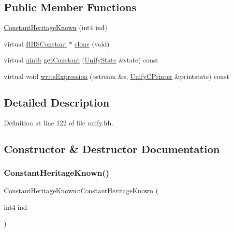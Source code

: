 \subsection*{Public Member Functions}
\begin{DoxyCompactItemize}
\item 
\mbox{\hyperlink{class_constant_heritage_known_aa29b63bf5dba8c4b2e4a177aefebe536}{Constant\+Heritage\+Known}} (int4 ind)
\item 
virtual \mbox{\hyperlink{class_r_h_s_constant}{R\+H\+S\+Constant}} $\ast$ \mbox{\hyperlink{class_constant_heritage_known_a07568a5e04c406e0a08fe2f07f15ccc1}{clone}} (void)
\item 
virtual \mbox{\hyperlink{types_8h_a2db313c5d32a12b01d26ac9b3bca178f}{uintb}} \mbox{\hyperlink{class_constant_heritage_known_a700e11fdfe28144dff4f55f05620f7b4}{get\+Constant}} (\mbox{\hyperlink{class_unify_state}{Unify\+State}} \&state) const
\item 
virtual void \mbox{\hyperlink{class_constant_heritage_known_a52ea0bf86bff79609c576a29a523660a}{write\+Expression}} (ostream \&s, \mbox{\hyperlink{class_unify_c_printer}{Unify\+C\+Printer}} \&printstate) const
\end{DoxyCompactItemize}


\subsection{Detailed Description}


Definition at line 122 of file unify.\+hh.



\subsection{Constructor \& Destructor Documentation}
\mbox{\label{class_constant_heritage_known_aa29b63bf5dba8c4b2e4a177aefebe536}} 
\subsubsection{\texorpdfstring{ConstantHeritageKnown()}{ConstantHeritageKnown()}}
{\footnotesize\ttfamily Constant\+Heritage\+Known\+::\+Constant\+Heritage\+Known (\begin{DoxyParamCaption}\item[{int4}]{ind }\end{DoxyParamCaption})\hspace{0.3cm}{\ttfamily [inline]}}



